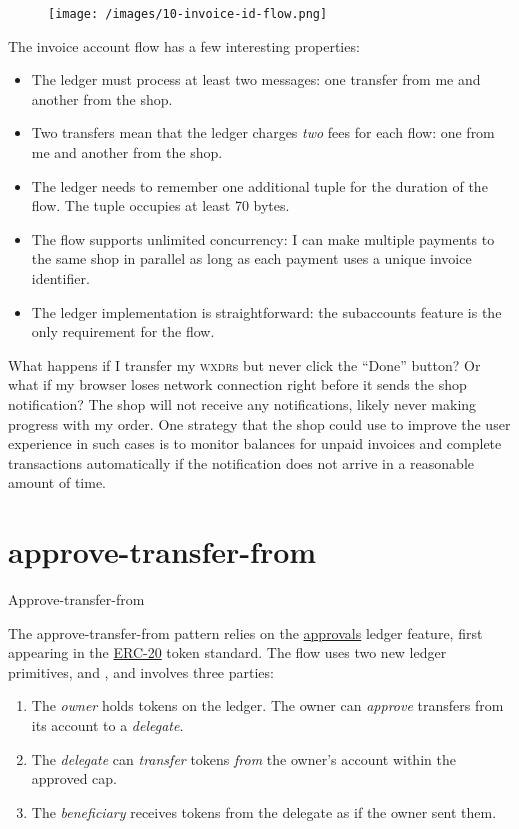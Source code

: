 \documentclass{article}
\begin{document}
\begin{figure}[grayscale-diagram]
\texttt{[image: /images/10-invoice-id-flow.png]}
\end{figure}

The invoice account flow has a few interesting properties:
\begin{itemize}
  \item The ledger must process at least two messages: one transfer from me and another from the shop.
  \item Two transfers mean that the ledger charges \emph{two} fees for each flow: one from me and another from the shop.
  \item
    The ledger needs to remember one additional  tuple for the duration of the flow.
    The tuple occupies at least 70 bytes.
  \item The flow supports unlimited concurrency: I can make multiple payments to the same shop in parallel as long as each payment uses a unique invoice identifier.
  \item
    The ledger implementation is straightforward: the subaccounts feature is the only requirement for the flow.
\end{itemize}

What happens if I transfer my \textsc{wxdr}s but never click the ``Done'' button?
Or what if my browser loses network connection right before it sends the shop notification?
The shop will not receive any notifications, likely never making progress with my order.
One strategy that the shop could use to improve the user experience in such cases is to monitor balances for unpaid invoices and complete transactions automatically if the notification does not arrive in a reasonable amount of time.

\section{approve-transfer-from}{Approve-transfer-from}

The approve-transfer-from pattern relies on the \href{/posts/09-fungible-tokens-101.html#approvals}{approvals} ledger feature, first appearing in the \href{https://ethereum.org/en/developers/docs/standards/tokens/erc-20/}{ERC-20} token standard.
The flow uses two new ledger primitives,  and , and involves three parties:
\begin{enumerate}
  \item The \emph{owner} holds tokens on the ledger. The owner can \emph{approve} transfers from its account to a \emph{delegate}.
  \item The \emph{delegate} can \emph{transfer} tokens \emph{from} the owner's account within the approved cap.
  \item The \emph{beneficiary} receives tokens from the delegate as if the owner sent them.
\end{enumerate}
\end{document}
